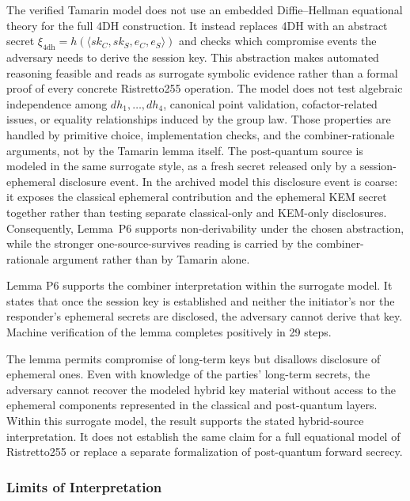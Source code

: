 \documentclass[preprint,12pt]{elsarticle}
\theoremstyle{remark}
\begin{document}
The verified Tamarin model does not use an embedded Diffie--Hellman equational theory for the full 4DH construction. It instead replaces 4DH with an abstract secret $\xi_{\mathrm{4dh}} = h(\langle sk_C,sk_S,e_C,e_S\rangle)$ and checks which compromise events the adversary needs to derive the session key. This abstraction makes automated reasoning feasible and reads as surrogate symbolic evidence rather than a formal proof of every concrete Ristretto255 operation. The model does not test algebraic independence among $dh_1,\ldots,dh_4$, canonical point validation, cofactor-related issues, or equality relationships induced by the group law. Those properties are handled by primitive choice, implementation checks, and the combiner-rationale arguments, not by the Tamarin lemma itself. The post-quantum source is modeled in the same surrogate style, as a fresh secret released only by a session-ephemeral disclosure event. In the archived model this disclosure event is coarse: it exposes the classical ephemeral contribution and the ephemeral KEM secret together rather than testing separate classical-only and KEM-only disclosures. Consequently, Lemma~P6 supports non-derivability under the chosen abstraction, while the stronger one-source-survives reading is carried by the combiner-rationale argument rather than by Tamarin alone.

Lemma P6 supports the combiner interpretation within the surrogate model. It states that once the session key is established and neither the initiator's nor the responder's ephemeral secrets are disclosed, the adversary cannot derive that key. Machine verification of the lemma completes positively in 29 steps.

The lemma permits compromise of long-term keys but disallows disclosure
of ephemeral ones. Even with knowledge of the parties' long-term
secrets, the adversary cannot recover the modeled hybrid key material
without access to the ephemeral components represented in the classical
and post-quantum layers. Within this surrogate model, the result
supports the stated hybrid-source interpretation. It does not establish
the same claim for a full equational model of Ristretto255 or replace a
separate formalization of post-quantum forward secrecy.

\subsubsection{Limits of Interpretation}
\end{document}
